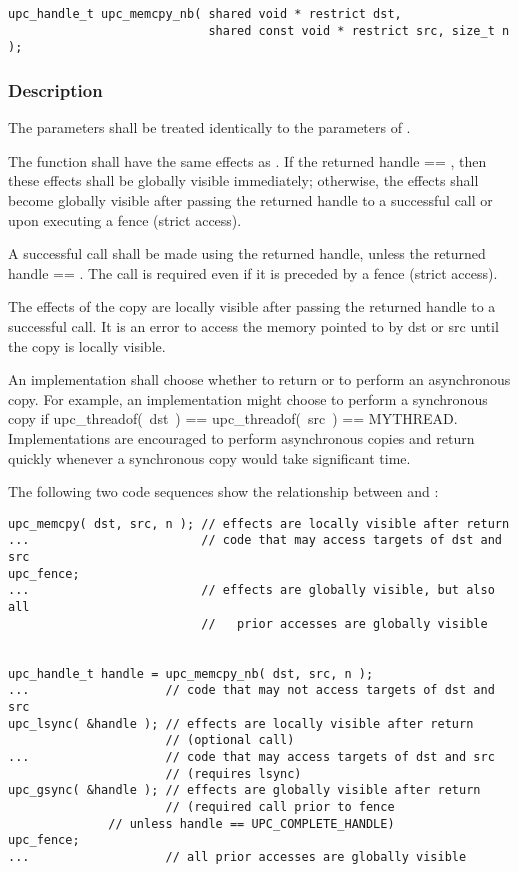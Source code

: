 \begin{verbatim}
upc_handle_t upc_memcpy_nb( shared void * restrict dst,
                            shared const void * restrict src, size_t n );
\end{verbatim}

\subsubsection{Description}

\npf The parameters shall be treated identically to the parameters of
\memcpy{}.

\np The \function{} function shall have the same effects as \memcpy{}.
If the returned handle == \complete{}, then these effects shall be globally
visible immediately; otherwise, the effects shall become globally visible after
passing the returned handle to a successful \gsync{} call or upon executing a
fence (strict access).

\np A successful \gsync{} call shall be made using the returned handle,
unless the returned handle == \complete{}.  The call is required even if it is
preceded by a fence (strict access).

\np The effects of the copy are locally visible after passing the
returned handle to a successful \lsync{} call.  It is an error to access the
memory pointed to by dst or src until the copy is locally visible.

\np An implementation shall choose whether to return \complete{} or to
perform an asynchronous copy.  For example, an implementation might choose to
perform a synchronous copy if upc\_threadof(~dst~) == upc\_threadof(~src~) ==
MYTHREAD.  Implementations are encouraged to perform asynchronous copies and
return quickly whenever a synchronous copy would take significant time.

\np The following two code sequences show the relationship between
\memcpy{} and \function{}:

\begin{verbatim}
upc_memcpy( dst, src, n ); // effects are locally visible after return
...                        // code that may access targets of dst and src
upc_fence;                 
...                        // effects are globally visible, but also all
                           //   prior accesses are globally visible


upc_handle_t handle = upc_memcpy_nb( dst, src, n );
...                   // code that may not access targets of dst and src
upc_lsync( &handle ); // effects are locally visible after return
                      // (optional call)
...                   // code that may access targets of dst and src
                      // (requires lsync)
upc_gsync( &handle ); // effects are globally visible after return
                      // (required call prior to fence
		      // unless handle == UPC_COMPLETE_HANDLE)
upc_fence;
...                   // all prior accesses are globally visible
\end{verbatim}


